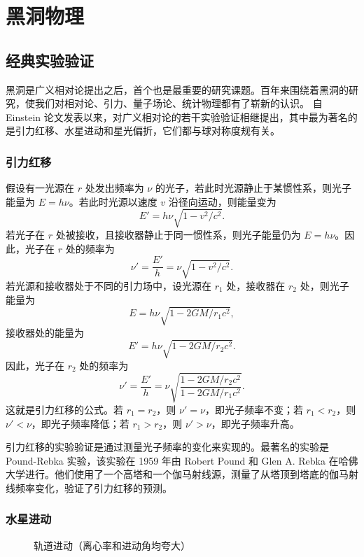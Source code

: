 \chapter{黑洞物理}\label{chpt:BH}

\section{经典实验验证}

黑洞是广义相对论提出之后，首个也是最重要的研究课题。百年来围绕着黑洞的研究，使我们对相对论、引力、量子场论、统计物理都有了崭新的认识。
自 Einstein 论文发表以来，对广义相对论的若干实验验证相继提出，其中最为著名的是引力红移、水星进动和星光偏折，它们都与球对称度规有关。

\subsection{引力红移}


假设有一光源在 $r$ 处发出频率为 $\nu$ 的光子，若此时光源静止于某惯性系，则光子能量为 $E=h\nu$。若此时光源以速度 $v$ 沿径向运动，则能量变为
\[E'=h\nu\sqrt{1-v^2/c^2}.\]
若光子在 $r$ 处被接收，且接收器静止于同一惯性系，则光子能量仍为 $E=h\nu$。因此，光子在 $r$ 处的频率为
\[\nu'=\frac{E'}{h}= \nu\sqrt{1-v^2/c^2}.\]
若光源和接收器处于不同的引力场中，设光源在 $r_1$ 处，接收器在 $r_2$ 处，则光子能量为
\[E=h\nu\sqrt{1-2GM/r_1c^2},\]
接收器处的能量为
\[E'=h\nu\sqrt{1-2GM/r_2c^2}.\]
因此，光子在 $r_2$ 处的频率为
\[\nu'=\frac{E'}{h}= \nu\sqrt{\frac{1-2GM/r_2c^2}{1-2GM/r_1c^2}}.\]
这就是引力红移的公式。若 $r_1=r_2$，则 $\nu'=\nu$，即光子频率不变；若 $r_1<r_2$，则 $\nu'<\nu$，即光子频率降低；若 $r_1>r_2$，则 $\nu'>\nu$，即光子频率升高。

引力红移的实验验证是通过测量光子频率的变化来实现的。最著名的实验是 Pound-Rebka 实验，该实验在 1959 年由 Robert Pound 和 Glen A. Rebka 在哈佛大学进行。他们使用了一个高塔和一个伽马射线源，测量了从塔顶到塔底的伽马射线频率变化，验证了引力红移的预测。

\subsection{水星进动}

\begin{figure}\centering
    \caption{\small 轨道进动（离心率和进动角均夸大）}
\end{figure}

